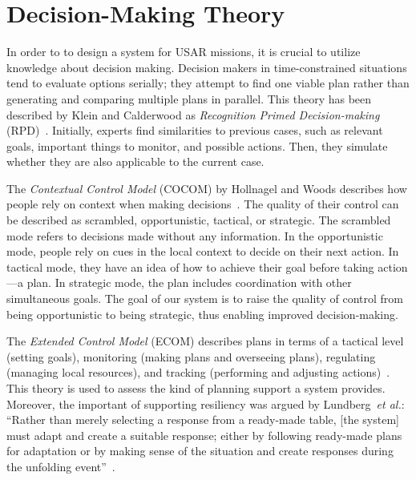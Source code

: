 \documentclass[conference,10pt,letter]{IEEEtran}
\def\etal{\textit{et al.}}
\begin{document}

\section{Decision-Making Theory} \label{sec:theory}
In order to to design a system for USAR missions, it is crucial to utilize knowledge about decision making. Decision makers in time-constrained situations tend to evaluate options serially; they attempt to find one viable plan rather than generating and comparing multiple plans in parallel. This theory has been described by Klein and Calderwood as \emph{Recognition Primed Decision-making} (RPD)~\cite{KleinCalderwood}. Initially, experts find similarities to previous cases, such as relevant goals, important things to monitor, and possible actions. Then, they simulate whether they are also applicable to the current case.

The \emph{Contextual Control Model} (COCOM) by Hollnagel and Woods describes how people rely on context when making decisions~\cite{hollnagel2005joint}. The quality of their control can be described as scrambled, opportunistic, tactical, or strategic. The scrambled mode refers to decisions made without any information. In the opportunistic mode, people rely on cues in the local context to decide on their next action. In tactical mode, they have an idea of how to achieve their goal before taking action---a plan. In strategic mode, the plan includes coordination with other simultaneous goals. The goal of our system is to raise the quality of control from being opportunistic to being strategic, thus enabling improved decision-making.

The \emph{Extended Control Model} (ECOM) describes plans in terms of a tactical level (setting goals), monitoring (making plans and overseeing plans), regulating (managing local resources), and tracking (performing and adjusting actions)~\cite{hollnagel2005joint}. This theory is used to assess the kind of planning support a system provides. Moreover, the important of supporting resiliency was argued by Lundberg~\etal : ``Rather than merely selecting a response from a ready-made table, [the system] must adapt and create a suitable response; either by following ready-made plans for adaptation or by making sense of the situation and create responses during the unfolding event''~\cite{Lundberg2012}.
\end{document}
